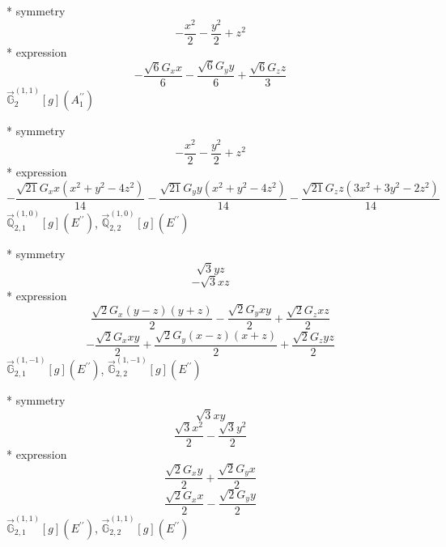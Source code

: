 \documentclass[fleqn,8pt]{jsarticle}
\begin{document}
\noindent\quad ** symmetry
\begin{dmath*}
- \frac{x^{2}}{2} - \frac{y^{2}}{2} + z^{2}
\end{dmath*}
\noindent\quad ** expression
\begin{dmath*}
- \frac{\sqrt{6} G_{x} x}{6} - \frac{\sqrt{6} G_{y} y}{6} + \frac{\sqrt{6} G_{z} z}{3}
\end{dmath*}
\noindent\quad $\vec{\mathbb{G}}_{2}^{(1,1)}[g](A_{1}^{\prime\prime})$

\noindent\quad ** symmetry
\begin{dmath*}
- \frac{x^{2}}{2} - \frac{y^{2}}{2} + z^{2}
\end{dmath*}
\noindent\quad ** expression
\begin{dmath*}
- \frac{\sqrt{21} G_{x} x \left(x^{2} + y^{2} - 4 z^{2}\right)}{14} - \frac{\sqrt{21} G_{y} y \left(x^{2} + y^{2} - 4 z^{2}\right)}{14} - \frac{\sqrt{21} G_{z} z \left(3 x^{2} + 3 y^{2} - 2 z^{2}\right)}{14}
\end{dmath*}
\noindent\quad $\vec{\mathbb{Q}}_{2,1}^{(1,0)}[g](E^{\prime\prime})$, $\vec{\mathbb{Q}}_{2,2}^{(1,0)}[g](E^{\prime\prime})$

\noindent\quad ** symmetry
\begin{dmath*}
\sqrt{3} y z
\end{dmath*}
\begin{dmath*}
- \sqrt{3} x z
\end{dmath*}
\noindent\quad ** expression
\begin{dmath*}
\frac{\sqrt{2} G_{x} \left(y - z\right) \left(y + z\right)}{2} - \frac{\sqrt{2} G_{y} x y}{2} + \frac{\sqrt{2} G_{z} x z}{2}
\end{dmath*}
\begin{dmath*}
- \frac{\sqrt{2} G_{x} x y}{2} + \frac{\sqrt{2} G_{y} \left(x - z\right) \left(x + z\right)}{2} + \frac{\sqrt{2} G_{z} y z}{2}
\end{dmath*}
\noindent\quad $\vec{\mathbb{G}}_{2,1}^{(1,-1)}[g](E^{\prime\prime})$, $\vec{\mathbb{G}}_{2,2}^{(1,-1)}[g](E^{\prime\prime})$

\noindent\quad ** symmetry
\begin{dmath*}
\sqrt{3} x y
\end{dmath*}
\begin{dmath*}
\frac{\sqrt{3} x^{2}}{2} - \frac{\sqrt{3} y^{2}}{2}
\end{dmath*}
\noindent\quad ** expression
\begin{dmath*}
\frac{\sqrt{2} G_{x} y}{2} + \frac{\sqrt{2} G_{y} x}{2}
\end{dmath*}
\begin{dmath*}
\frac{\sqrt{2} G_{x} x}{2} - \frac{\sqrt{2} G_{y} y}{2}
\end{dmath*}
\noindent\quad $\vec{\mathbb{G}}_{2,1}^{(1,1)}[g](E^{\prime\prime})$, $\vec{\mathbb{G}}_{2,2}^{(1,1)}[g](E^{\prime\prime})$
\end{document}
